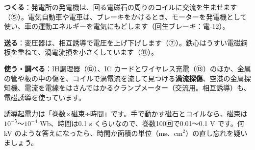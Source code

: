 \begin{phkougaku}
\textbf{つくる}：発電所の発電機は、回る電磁石の周りのコイルに交流を生ませます（⑤）。電気自動車や電車は、ブレーキをかけるとき、モーターを発電機として使い、車の運動エネルギーを電気にもどします（回生ブレーキ：電-12）。

\textbf{送る}：変圧器は、相互誘導で電圧を上げ下げします（⑦）。鉄心はうすい電磁鋼板を重ねて、渦電流損を小さくしています（⑪）。

\textbf{使う・調べる}：IH調理器（⑫）、IC カードとワイヤレス充電（⑬）のほか、金属の管や板の中の傷を、コイルで渦電流を流して見つける\textbf{渦流探傷}、空港の金属探知機、電流を電線をはさんではかるクランプメーター（交流用。相互誘導）も、電磁誘導を使っています。

\begin{phketa}[電磁誘導の数の目安]
誘導起電力は「巻数×磁束÷時間」です。手で動かす磁石とコイルなら、磁束は $10^{-5}$〜$10^{-4}$ Wb、時間は0.1 s くらいなので、巻数100回で0.01〜0.1 V です。何 kV のような答えになったら、時間か面積の単位（ms、cm$^2$）の直し忘れを疑いましょう。
\end{phketa}
\end{phkougaku}

